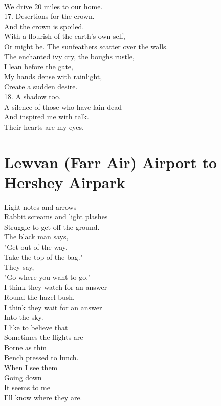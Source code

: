 \documentclass[smalldemyvopaper,11pt,twoside,onecolumn,openright,extrafontsizes]{memoir}
\begin{document}
\\We drive 20 miles to our home.
\\17. Desertions for the crown.
\\And the crown is spoiled.
\\With a flourish of the earth's own self,
\\Or might be. The sunfeathers scatter over the walls.
\\The enchanted ivy cry, the boughs rustle,
\\I lean before the gate,
\\My hands dense with rainlight,
\\Create a sudden desire.
\\18. A shadow too.
\\A silence of those who have lain dead
\\And inspired me with talk.
\\Their hearts are my eyes.



\chapter{Lewvan (Farr Air) Airport to Hershey Airpark}
Light notes and arrows
\\Rabbit screams and light plashes
\\Struggle to get off the ground.
\\The black man says,
\\"Get out of the way,
\\Take the top of the bag."
\\They say,
\\"Go where you want to go."
\\I think they watch for an answer
\\Round the hazel bush.
\\I think they wait for an answer
\\Into the sky.
\\I like to believe that
\\Sometimes the flights are
\\Borne as thin
\\Bench pressed to lunch.
\\When I see them
\\Going down
\\It seems to me
\\I'll know where they are.
\end{document}
